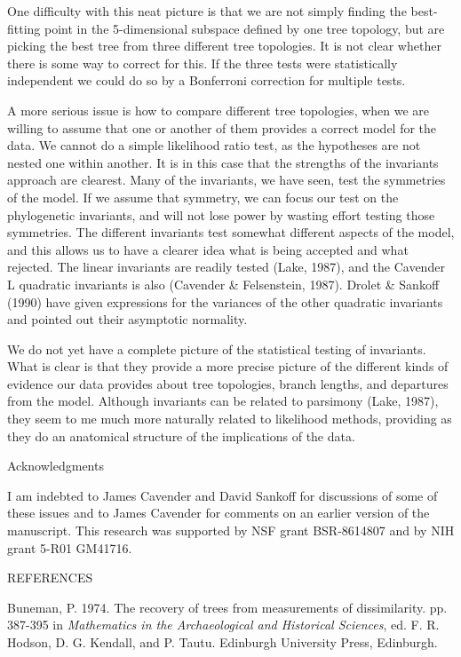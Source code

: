 One difficulty with this neat picture is that we are not simply finding the
best-fitting point in the 5-dimensional subspace defined by one tree topology,
but are picking the best tree from three different tree topologies.  It is not
clear whether there is some way to correct for this.  If the three tests
were statistically independent we could do so by a Bonferroni correction for
multiple tests.

A more serious issue is how to compare different tree topologies, when we are
willing to assume that one or another of them provides a correct model for the
data.  We cannot do a simple likelihood ratio test, as the hypotheses are
not nested one within another.  It is in this case that the strengths of the
invariants approach are clearest.  Many of the invariants, we have seen, test
the symmetries of the model.  If we assume that symmetry, we can focus our
test on the phylogenetic invariants, and will not lose power by wasting effort
testing those symmetries.  The different invariants test somewhat different
aspects of the model, and this allows us to have a clearer idea what is being
accepted and what rejected.  The linear invariants are readily tested
(Lake, 1987), and the Cavender L quadratic invariants is also (Cavender \&
Felsenstein, 1987). Drolet \& Sankoff (1990) have given expressions for the
variances of the other quadratic invariants and pointed out their asymptotic
normality.

We do not yet have a complete picture of the statistical testing of invariants.
What is clear is that they provide a more precise picture of the different
kinds of evidence our data provides about tree topologies, branch lengths, and
departures from the model.  Although invariants can be related to parsimony
(Lake, 1987), they seem to me much more naturally related to likelihood methods,
providing as they do an anatomical structure of the implications of the data.

\newpage

\centerline{Acknowledgments}
\bigskip

I am indebted to James Cavender and David Sankoff for discussions of some
of these issues and to James Cavender for comments on an earlier version of
the manuscript.  This research was supported by NSF grant BSR-8614807 and by
NIH grant 5-R01 GM41716.

\newpage

\centerline{REFERENCES}
\bigskip
 
Buneman, P.  1974. The recovery of trees from measurements of dissimilarity.
pp. 387-395 in {\it Mathematics in the Archaeological and Historical Sciences},
ed. F. R. Hodson, D. G. Kendall, and P. Tautu.  Edinburgh University Press,
Edinburgh.
\medskip

